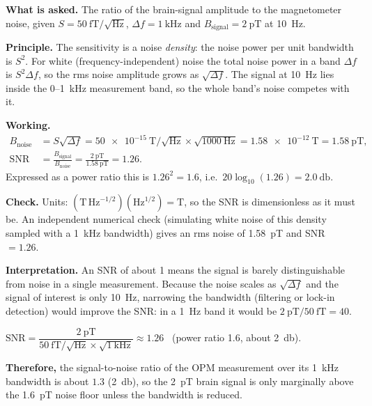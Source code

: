 \documentclass[11pt]{article}
\newcommand{\closing}[1]{\par\medskip\noindent\textbf{Therefore,} #1}
\newcommand{\sqHz}{\ensuremath{/\sqrt{\mathrm{Hz}}}}
\begin{document}
\textbf{What is asked.} The ratio of the brain-signal amplitude to the magnetometer noise, given
$S = \SI{50}{\femto\tesla}\sqHz$, $\Delta f = \SI{1}{\kilo\hertz}$ and
$B_{\mathrm{signal}} = \SI{2}{\pico\tesla}$ at \SI{10}{\hertz}.

\textbf{Principle.} The sensitivity is a noise \emph{density}: the noise power per unit bandwidth
is $S^2$. For white (frequency-independent) noise the total noise power in a band $\Delta f$ is
$S^2\Delta f$, so the rms noise amplitude grows as $\sqrt{\Delta f}$. The signal at \SI{10}{\hertz}
lies inside the 0--\SI{1}{\kilo\hertz} measurement band, so the whole band's noise competes with it.

\textbf{Working.}
\begin{align*}
B_{\mathrm{noise}} &= S\sqrt{\Delta f}
 = \SI{50e-15}{\tesla}\sqHz \times \sqrt{\SI{1000}{\hertz}}
 = \SI{1.58e-12}{\tesla} = \SI{1.58}{\pico\tesla},\\[2pt]
\mathrm{SNR} &= \frac{B_{\mathrm{signal}}}{B_{\mathrm{noise}}}
 = \frac{\SI{2}{\pico\tesla}}{\SI{1.58}{\pico\tesla}} = 1.26 .
\end{align*}
Expressed as a power ratio this is $1.26^2 = 1.6$, i.e.\ $20\log_{10}(1.26) = \SI{2.0}{\decibel}$.

\textbf{Check.} Units: $(\si{\tesla}\,\mathrm{Hz}^{-1/2})(\mathrm{Hz}^{1/2}) = \si{\tesla}$, so the SNR is
dimensionless as it must be. An independent numerical check (simulating white noise of this
density sampled with a \SI{1}{\kilo\hertz} bandwidth) gives an rms noise of
\SI{1.58}{\pico\tesla} and SNR $=1.26$.

\textbf{Interpretation.} An SNR of about 1 means the signal is barely distinguishable from noise
in a single measurement. Because the noise scales as $\sqrt{\Delta f}$ and the signal of interest
is only \SI{10}{\hertz}, narrowing the bandwidth (filtering or lock-in detection) would improve
the SNR: in a \SI{1}{\hertz} band it would be $\SI{2}{\pico\tesla}/\SI{50}{\femto\tesla} = 40$.

\begin{answerbox}
$\mathrm{SNR} = \dfrac{\SI{2}{\pico\tesla}}{\SI{50}{\femto\tesla}\sqHz\times\sqrt{\SI{1}{\kilo\hertz}}} \approx 1.26$
\ (power ratio 1.6, about \SI{2}{\decibel}).
\closing{the signal-to-noise ratio of the OPM measurement over its \SI{1}{\kilo\hertz} bandwidth is
about $1.3$ (\SI{2}{\decibel}), so the \SI{2}{\pico\tesla} brain signal is only marginally above the
\SI{1.6}{\pico\tesla} noise floor unless the bandwidth is reduced.}
\end{answerbox}
\end{document}
